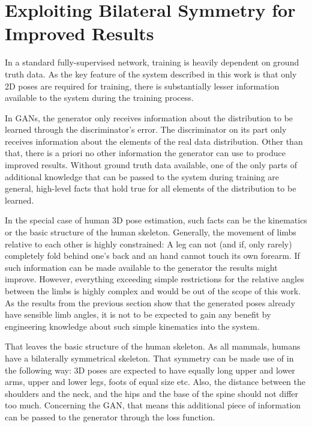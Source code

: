 \section{
	Exploiting Bilateral Symmetry for Improved Results}


In a standard fully-supervised network, training is heavily dependent on ground truth data.
As the key feature of the system described in this work is that only 2D poses are required for training, there is substantially lesser information available to the system during the training process.

In GANs, the generator only receives information about the distribution to be learned through the discriminator's error.
The discriminator on its part only receives information about the elements of the real data distribution.
Other than that, there is a priori no other information the generator can use to produce improved results.
Without ground truth data available, one of the only parts of additional knowledge that can be passed to the system during training are general, high-level facts that hold true for all elements of the distribution to be learned.

In the special case of human 3D pose estimation, such facts can be the kinematics or the basic structure of the human skeleton.
Generally, the movement of limbs relative to each other is highly constrained:
A leg can not (and if, only rarely) completely fold behind one's back and an hand cannot touch its own forearm.
If such information can be made available to the generator the results might improve.
However, everything exceeding simple restrictions for the relative angles between the limbs is highly complex and would be out of the scope of this work.
As the results from the previous section show that the generated poses already have sensible limb angles, it is not to be expected to gain any benefit by engineering knowledge about such simple kinematics into the system.

That leaves the basic structure of the human skeleton.
As all mammals, humans have a bilaterally symmetrical skeleton.
That symmetry can be made use of in the following way:
3D poses are expected to have equally long upper and lower arms, upper and lower legs, foots of equal size etc.
Also, the distance between the shoulders and the neck, and the hips and the base of the spine should not differ too much.
Concerning the GAN, that means this additional piece of information can be passed to the generator through the loss function.

